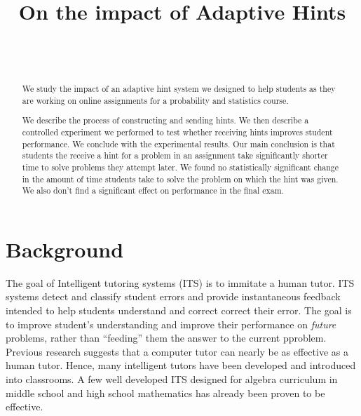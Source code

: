 \documentclass{sigchi/sigchi}
\title{On the impact of Adaptive Hints}
\author{
  \alignauthor{Zhen Zhai\\
    \affaddr{UC San Diego}\\
    \email{zzhai@eng.ucsd.edu}}\\
  \alignauthor{Yoav Freund\\
    \affaddr{UC San Diego}\\
    \email{yfreund@eng.ucsd.edu}}\\
}
\begin{document}
\maketitle


\begin{abstract}
We study the impact of an adaptive hint system we designed to help students as they are working on online assignments for a probability and statistics course.

We describe the process of constructing and sending hints. We then describe a controlled experiment we performed to test whether receiving hints improves student performance. We conclude with the experimental results. Our main conclusion is that students the receive a hint for a problem in an assignment take significantly shorter time to solve problems they attempt later. We found no statistically significant change in the amount of time students take to solve the problem on which the hint was given. We also don't find a significant effect on performance in the final exam.

\end{abstract}

\section*{Background}
The goal of Intelligent tutoring systems (ITS)\cite{Anderson1995} is
to immitate a human tutor.  ITS systems detect and classify student
errors and provide instantaneous feedback intended to help students
understand and correct correct their error. The goal is to improve
student's understanding and improve their performance on {\em future}
problems, rather than ``feeding'' them the answer to the current
pproblem.  Previous research suggests that a computer tutor can nearly
be as effective as a human tutor\cite{Vanlehn2011}. Hence, many
intelligent tutors have been developed and introduced into
classrooms. A few well developed ITS designed for algebra curriculum
in middle school and high school mathematics has already been proven
to be effective\cite{Koedinger1997,John2014}.
\end{document}
